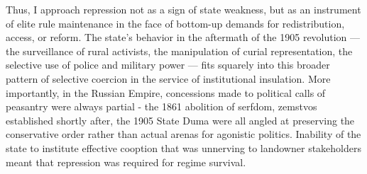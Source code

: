 \documentclass[10pt]{scrarticle}
\begin{document}
Thus, I approach repression not as a sign of state weakness, but as an instrument of elite rule maintenance in the face of bottom-up demands for redistribution, access, or reform. The state’s behavior in the aftermath of the 1905 revolution — the surveillance of rural activists, the manipulation of curial representation, the selective use of police and military power — fits squarely into this broader pattern of selective coercion in the service of institutional insulation. More importantly, in the Russian Empire, concessions made to political calls of peasantry were always partial - the 1861 abolition of serfdom, zemstvos established shortly after, the 1905 State Duma were all angled at preserving the conservative order rather than actual arenas for agonistic politics. Inability of the state to institute effective cooption that was unnerving to landowner stakeholders meant that repression was required for regime survival.

\printbibliography
\end{document}
